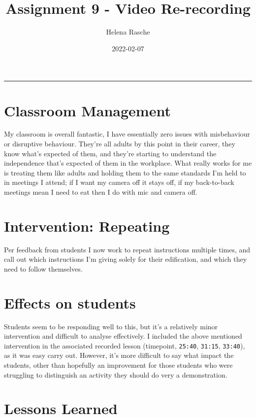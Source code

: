 \documentclass[paper=a4,justified,a4paper]{tufte-handout}
\title[A9 - Video Re-recording]{Assignment 9 - Video Re-recording}
\author{Helena Rasche}
\date{2022-02-07}
\begin{document}
\maketitle
\noindent\rule{5in}{0.4pt}


\hypertarget{classroom-management}{%
\section{Classroom Management}\label{classroom-management}}

My classroom is overall fantastic, I have essentially zero issues with
misbehaviour or disruptive behaviour. They're all adults by this point
in their career, they know what's expected of them, and they're starting
to understand the independence that's expected of them in the workplace.
What really works for me is treating them like adults and holding them
to the same standards I'm held to in meetings I attend; if I want my
camera off it stays off, if my back-to-back meetings mean I need to eat
then I do with mic and camera off.

\hypertarget{intervention-repeating}{%
\section{Intervention: Repeating}\label{intervention-repeating}}

Per feedback from students I now work to repeat instructions multiple
times, and call out which instructions I'm giving solely for their
edification, and which they need to follow themselves.

\hypertarget{effects-on-students}{%
\section{Effects on students}\label{effects-on-students}}

Students seem to be responding well to this, but it's a relatively minor
intervention and difficult to analyse effectively. I included the above
mentioned intervention in the associated recorded lesson (timepoint,
\texttt{25:40}, \texttt{31:15}, \texttt{33:40}), as it was easy carry
out. However, it's more difficult to say what impact the students, other
than hopefully an improvement for those students who were struggling to
distinguish an activity they should do very a demonstration.

\hypertarget{lessons-learned}{%
\section{Lessons Learned}\label{lessons-learned}}
\end{document}
